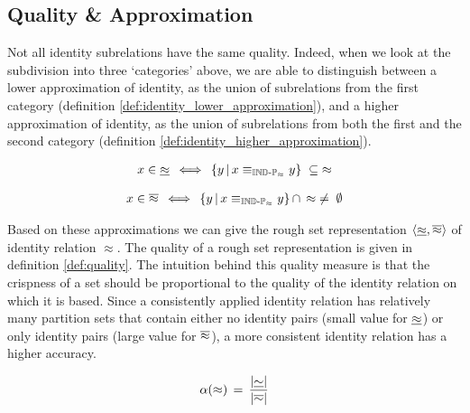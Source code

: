 \subsection{Quality \& Approximation}
\label{sec:approximation}

Not all identity subrelations have the same quality.
Indeed, when we look at the subdivision into three `categories' above,
  we are able to distinguish between a lower approximation of identity,
  as the union of subrelations from the first category
  (definition \ref{def:identity_lower_approximation}),
  and a higher approximation of identity,
  as the union of subrelations from both the first and the second category
  (definition \ref{def:identity_higher_approximation}).

\begin{definition}
\label{def:identity_lower_approximation}
\begin{align}
  x \in \underline{\approx}
\, \iff \,
    \{y\,\vert\,x \equiv_{\operatorname{{\mathbb{IND}-\mathbb{P}}}_{\approx}} y\}
  \; \subseteq \;
    \approx\nonumber
\end{align}
\end{definition}

\begin{definition}
\label{def:identity_higher_approximation}
\begin{align}
  x \in \overline{\approx}
\, \iff \,
      \{y\,\vert\,x \equiv_{\operatorname{{\mathbb{IND}-\mathbb{P}}}_{\approx}} y\}
    \, \cap \,
      \approx
  \; \neq \;
    \emptyset\nonumber
\end{align}
\end{definition}

\noindent Based on these approximations we can give
  the rough set representation $\langle\underline{\approx},\overline{\approx}\rangle$
  of identity relation $\approx$.
The quality of a rough set representation is given in
  definition \ref{def:quality}.
The intuition behind this quality measure is that the crispness
  of a set should be proportional to the quality
  of the identity relation on which it is based.
Since a consistently applied identity relation has relatively many
  partition sets that contain either
  no identity pairs (small value for $\underline{\approx}$) or
  only identity pairs (large value for $\overline{\approx}$),
  a more consistent identity relation has a higher accuracy.

\begin{definition}[Quality]
\label{def:quality}
\begin{align}
  \alpha(\approx)
\, = \,
  \dfrac{
    \lvert\underline{\sim}\rvert
  }{
    \lvert\overline{\sim}\rvert
  }\nonumber
\end{align}
\end{definition}

